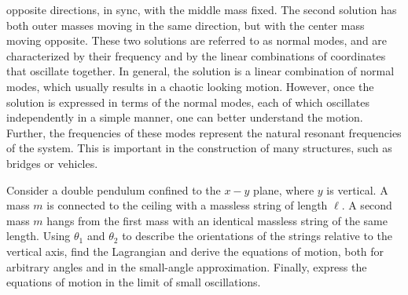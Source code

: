 opposite directions, in sync, with the middle mass fixed. The second
solution has both outer masses moving in the same direction, but with
the center mass moving opposite. These two solutions are referred to
as normal modes, and are characterized by their frequency and by the
linear combinations of coordinates that oscillate together. In
general, the solution is a linear combination of normal modes, which
usually results in a chaotic looking motion. However, once the
solution is expressed in terms of the normal modes, each of which
oscillates independently in a simple manner, one can better understand
the motion. Further, the frequencies of these modes represent the
natural resonant frequencies of the system. This is important in the
construction of many structures, such as bridges or vehicles.

\example Consider a double pendulum confined to the $x-y$ plane, where
$y$ is vertical. A mass $m$ is connected to the ceiling with a
massless string of length $\ell$. A second mass $m$ hangs from the
first mass with an identical massless string of the same length. Using
$\theta_1$ and $\theta_2$ to describe the orientations of the strings
relative to the vertical axis, find the Lagrangian and derive the
equations of motion, both for arbitrary angles and in the small-angle
approximation. Finally, express the equations of motion in the limit
of small oscillations.

